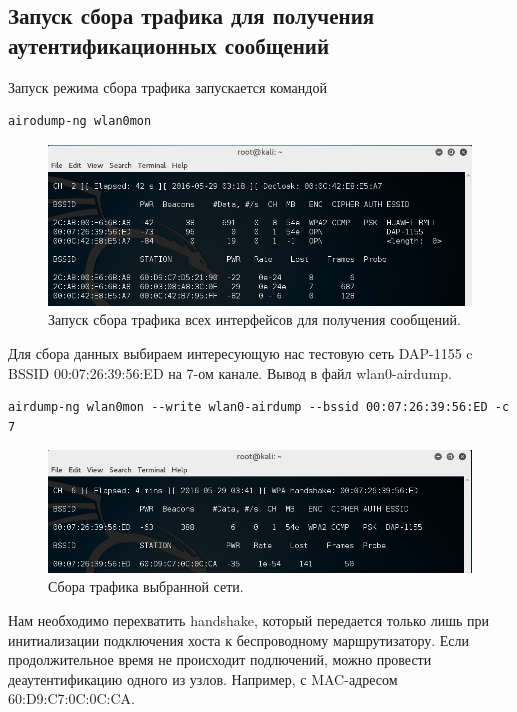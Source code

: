 \documentclass[10pt,a4paper]{article}
\begin{document}
\subsection{Запуск сбора трафика для получения аутентификационных сообщений}
Запуск режима сбора трафика запускается командой
\begin{verbatim}
airodump-ng wlan0mon
\end{verbatim}

\begin{figure}[h]
\centering
\includegraphics[width=\textwidth]{airodump_all}
\caption{Запуск сбора трафика всех интерфейсов для получения сообщений.}
\end{figure}

Для сбора данных выбираем интересующую нас тестовую сеть DAP-1155 c BSSID 00:07:26:39:56:ED на 7-ом канале. Вывод в файл wlan0-airdump.
\begin{verbatim}
airdump-ng wlan0mon --write wlan0-airdump --bssid 00:07:26:39:56:ED -c 7
\end{verbatim}

\begin{figure}[h]
\centering
\includegraphics[width=\textwidth]{airodump_1}
\caption{Сбора трафика выбранной сети.}
\end{figure}

Нам необходимо перехватить handshake, который передается только лишь при инитиализации подключения хоста к беспроводному маршрутизатору. Если продолжительное время не происходит подлючений, можно провести деаутентификацию одного из узлов. Например, с MAC-адресом 60:D9:C7:0C:0C:CA.
\end{document}

